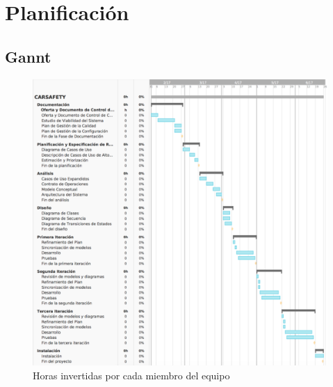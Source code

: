 \section{Planificación}
\subsection{Gannt}
\par {}
\begin{figure}[H]
\begin{center}
\includegraphics[width=1\textwidth]{./img/gannt.png}
\end{center}
\caption{Horas invertidas por cada miembro del equipo}
\label{tab:horasMiembro}
\end{figure}
